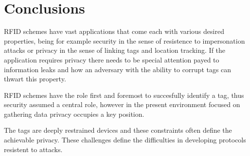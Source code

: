 \chapter*{Conclusions} 





RFID schemes have vast applications that come each with various desired properties, being for example security in the sense of resistence to impersonation attacks 
or privacy in the sense of linking tags and location tracking. If the application requires privacy there needs to be special attention payed to information leaks
and how an adversary with the ability to corrupt tags can thwart this property.

RFID schemes have the role first and foremost to succesfully identify a tag, thus security assumed a central role, however in the present environment focused on 
gathering data privacy occupies a key position.

The tags are deeply restrained devices and these constraints often define the achievable privacy. These challenges define the difficulties in developing protocols
resistent to attacks.